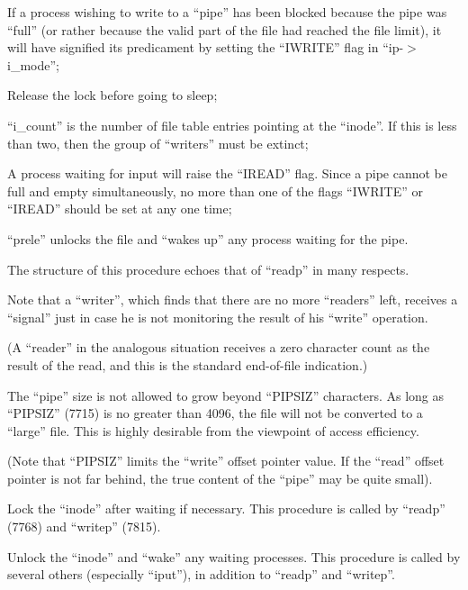 \item[7776:] If a process wishing to write  to
      a ``pipe'' has been blocked because
      the pipe was  ``full''  (or  rather
      because  the  valid  part  of the
      file had reached the file limit),
      it will have signified its predicament by  setting  the  ``IWRITE''
      flag in ``ip-$>$i\_mode'';

\item[7786:] Release the lock before going  to
      sleep;

\item[7787:] ``i\_count'' is the number  of  file
      table  entries  pointing  at  the
      ``inode''. If  this  is  less  than
      two,  then the group of ``writers''
      must be extinct;

\item[7789:] A process waiting for input  will
raise  the ``IREAD'' flag.  Since a
pipe cannot  be  full  and  empty
simultaneously,  no more than one
of the flags ``IWRITE'' or  ``IREAD''
should be set at any one time;

\item[7799:] ``prele''  unlocks  the  file   and
      ``wakes  up''  any  process waiting
      for the pipe.
\ed


The structure of this procedure  echoes
that of ``readp'' in many respects.

\bd
\item[7828:] Note that a ``writer'', which finds
      that  there are no more ``readers''
      left, receives a ``signal'' just in
      case  he  is  not  monitoring the
      result of his ``write'' operation.

(A  ``reader''  in  the   analogous
situation receives a zero character count as the  result  of  the
read,  and  this  is the standard
end-of-file indication.)

\item[7835:] The ``pipe'' size is not allowed to
      grow  beyond ``PIPSIZ'' characters.
      As long as ``PIPSIZ'' (7715) is  no
      greater  than 4096, the file will
      not be  converted  to  a  ``large''
      file.  This  is  highly desirable
      from  the  viewpoint  of   access
      efficiency.

(Note that  ``PIPSIZ''  limits  the
``write''  offset pointer value. If
the ``read'' offset pointer is  not
far  behind,  the true content of
the ``pipe'' may be quite small).
\ed




Lock  the  ``inode''  after  waiting   if
necessary.  This procedure is called by
``readp'' (7768) and ``writep'' (7815).



Unlock the ``inode'' and ``wake''
any waiting processes. This procedure is called
by several others (especially  ``iput''),
in addition to ``readp'' and ``writep''.
